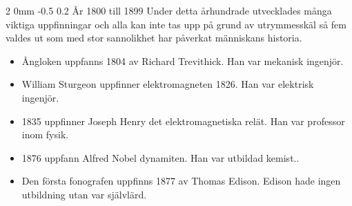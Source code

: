 \documentclass[a4paper,12pt]{article}
\makeatletter
\renewcommand{\subsection}{\@startsection
   {subsection}%
   {2}%
   {0mm}%
   {-0.5\baselineskip}%
   {0.2\baselineskip}%
   {\rmfamily\normalfont\slshape\normalsize}}%
\makeatother
\begin{document}
\subsection{År 1800 till 1899}
Under detta århundrade utvecklades många viktiga uppfinningar och alla kan inte tas upp på grund av utrymmesskäl så fem valdes ut som med stor sannolikhet har påverkat människans historia.
\begin{itemize}
\item Ångloken uppfanns 1804 av Richard Trevithick.\cite{trevishick} Han var mekanisk ingenjör.\cite{trevithick-life}

\item William Sturgeon uppfinner elektromagneten 1826.\cite{sturgeon} Han var elektrisk ingenjör.\cite{sturgeon-life}

\item 1835 uppfinner Joseph Henry det elektromagnetiska relät.\cite{henry} Han var professor inom fysik.\cite{henry-life}

\item 1876 uppfann Alfred Nobel dynamiten.\cite{nobel} Han var utbildad kemist.\cite{nobel-life}.

\item Den första fonografen uppfinns 1877 av Thomas Edison.\cite{edison} Edison hade ingen utbildning utan var självlärd.\cite{edison-life}
\end{itemize}
\end{document}
